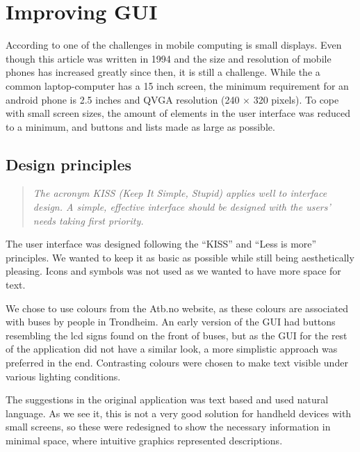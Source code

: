 \section{Improving GUI}
According to \cite{mchallenges} one of the challenges in mobile computing is small displays. Even though this article was written in 1994 and the size and resolution of mobile phones has increased greatly since then, it is still a challenge. While the a common laptop-computer has a 15 inch screen, the minimum requirement for an android phone is 2.5 inches and QVGA resolution (240 $\times$ 320 pixels). To cope with small screen sizes, the amount of elements in the user interface was reduced to a minimum, and buttons and lists made as large as possible. 
\subsection{Design principles}
\begin{quotation}
\emph{
The acronym KISS (Keep It Simple, Stupid) applies well to interface design. A simple, effective interface should be designed with the users' needs taking first priority.} \cite{guikisses}
\end{quotation}
\vspace{10 pt}
The user interface was designed following the ``KISS'' and ``Less is more'' principles. We wanted to keep it as basic as possible while still being aesthetically pleasing. Icons and symbols was not used as we wanted to have more space for text.

We chose to use colours from the Atb.no website, as these colours are associated with buses by people in Trondheim.
An early version of the GUI had buttons resembling the lcd signs found on the front of buses, but as the GUI for the rest of the application did not have a similar look, a more simplistic approach was preferred in the end. Contrasting colours were chosen to make text visible under various lighting conditions.

The suggestions in the original application was text based and used natural language. As we see it, this is not a very good solution for handheld devices with small screens, so these were redesigned to show the necessary information in minimal space, where intuitive graphics represented descriptions.

